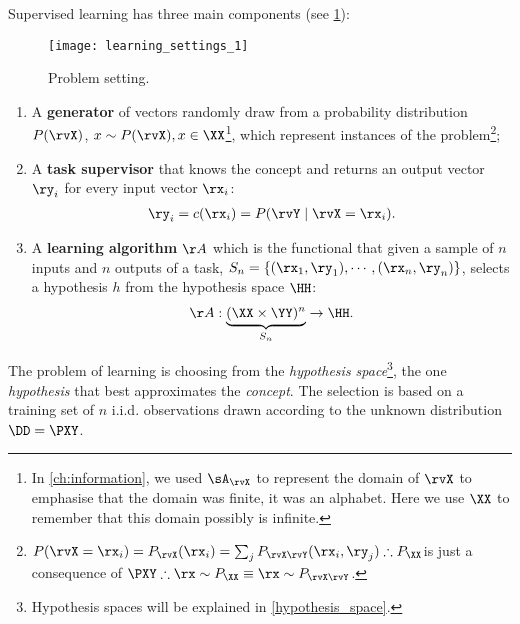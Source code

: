 Supervised learning has three main components (see \cref{fig:problem_setting}):
\begin{figure}
	[ht] \centering
	\texttt{[image: learning\_settings\_1]}
	\caption{Problem setting.}\label{fig:problem_setting}
\end{figure}
\begin{enumerate}
	\item A \textbf{generator} of vectors randomly draw from a probability distribution \(P(\rvX)\), \(x\sim P(\rvX), x \in \XX \)\footnote{In \cref{ch:information}, we used $\sA_{\rvX}$ to represent the domain of $\rvX$ to emphasise that the domain was finite, it was an alphabet. Here we use $\XX$ to remember that this domain possibly is infinite.}, which represent instances of the problem\footnote{\(P(\rvX=\rx_i) = P_{\rvX}(\rx_i) = \sum_j P_{\rvX\rvY}(\rx_i, \ry_j) \therefore P_{\XX}\)is just a consequence of \(\PXY \therefore \rx \sim P_{\XX} \equiv \rx \sim P_{\rvX\rvY}\).};
	\item A \textbf{task supervisor} that knows the concept and returns an output vector \(\ry_i\) for every input vector \(\rx_i\):
	\begin{align}
		\ry_i = c(\rx_i) = P(\rvY \mid \rvX=\rx_i).
	\end{align}
	\item A \textbf{learning algorithm} \(\AA\) which is the functional that given a sample of \(n\) inputs and \(n\) outputs of a task, \(S_n = \{(\rx_1,\ry_1), \cdots, (\rx_n, \ry_n)\}\), selects a hypothesis \(h\) from the hypothesis space \(\HH\):
	\begin{align}
		\AA: \underbrace{(\XX \times \YY)^n}_{S_n} \to \HH .
	\end{align}
\end{enumerate}

The problem of learning is choosing from the \emph{hypothesis space}\footnote{Hypothesis spaces will be explained in \cref{hypothesis_space}.}, the one \emph{hypothesis} that best approximates the \emph{concept}. The selection is based on a training set of \(n\) i.i.d. observations drawn according to the unknown distribution \(\DD= \PXY\).


